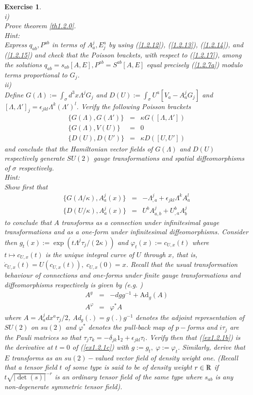 \documentclass[12pt]{report}
\newtheorem{Exercise}{Exercise}[section]
\def\ba{\begin{eqnarray}}
\def\ea{\end{eqnarray}}
\def\Rl{{\mathchoice
{\setbox0=\hbox{$\displaystyle\rm R$}\hbox{\hbox to0pt
{\kern0.4\wd0\vrule height0.9\ht0\hss}\box0}}
{\setbox0=\hbox{$\textstyle\rm R$}\hbox{\hbox to0pt
{\kern0.4\wd0\vrule height0.9\ht0\hss}\box0}}
{\setbox0=\hbox{$\scriptstyle\rm R$}\hbox{\hbox to0pt
{\kern0.4\wd0\vrule height0.9\ht0\hss}\box0}}
{\setbox0=\hbox{$\scriptscriptstyle\rm R$}\hbox{\hbox to0pt
{\kern0.4\wd0\vrule height0.9\ht0\hss}\box0}}}}
\begin{document}
\begin{Exercise} \label{ex1.2.1} ~~~~\\
i)\\
Prove theorem \ref{th1.2.0}.\\
Hint:\\
Express $q_{ab},P^{ab}$ in terms of $A_a^j,E^a_j$ by using 
(\ref{1.2.12}), (\ref{1.2.13}), (\ref{1.2.14}), and (\ref{1.2.15})
and check that the Poisson brackets, with respect to (\ref{1.2.17}),
among the solutions 
$q_{ab}=s_{ab}[A,E],P^{ab}=S^{ab}[A,E]$ equal precisely
(\ref{1.2.7a}) modulo terms proportional to $G_j$.\\
ii)\\ 
Define $G(\Lambda):=\int_\sigma d^3x \Lambda^j G_j$ and 
$D(U):=\int_\sigma U^a[V_a-A_a^j G_j]$ and $[\Lambda,\Lambda']_j
=\epsilon_{jkl} \Lambda^k(\Lambda')^l$. Verify the following 
Poisson brackets
\ba \label{ex1.2.1a}
\{G(\Lambda),G(\Lambda')\} &=& \kappa G([\Lambda,\Lambda'])
\nonumber\\
\{G(\Lambda),V(U)\} &=& 0 \nonumber\\
\{D(U),D(U')\}&=&\kappa D([U,U'])
\ea
and conclude that the Hamiltonian vector fields of $G(\Lambda)$ and $D(U)$ 
respectively generate $SU(2)$ gauge transformations and spatial
diffeomorphisms of $\sigma$ respectively. \\
Hint:\\
Show first that 
\ba \label{ex1.2.1b}
\{G(\Lambda/\kappa),A_a^j(x)\} &=&-\Lambda^j_{,a}+\epsilon_{jkl} 
\Lambda^k A_a^l \nonumber\\
\{D(U/\kappa),A_a^j(x)\} &=& U^b A^j_{a,b}+ U^b_{,a} A^j_b
\ea
to conclude that $A$ transforms as a connection under infinitesimal
gauge transformations and as a one-form under infinitesimal 
diffeomorphisms. Consider then $g_t(x):=\exp(t\Lambda^j \tau_j/(2\kappa))$
and $\varphi_t(x):=c_{U,x}(t)$ where $t\mapsto c_{U,x}(t)$ is the unique 
integral curve of $U$ through $x$, that is, 
$\dot{c}_{U,x}(t)=U(c_{U,x}(t)),\;c_{U,x}(0)=x$. Recall
that the usual transformation behaviour of connections and one-forms under
finite gauge transformations and diffeomorphisms respectively is given by
(e.g. \cite{24a})
\ba \label{ex1.2.1c}
A^g &=& -dg g^{-1}+\mbox{Ad}_g (A) \nonumber\\
A^\varphi &=& \varphi^\ast A 
\ea
where $A=A_a^j dx^a \tau_j/2$, Ad$_g(.)=g(.)g^{-1}$ denotes the 
adjoint representation of $SU(2)$ on $su(2)$ and $\varphi^\ast$ denotes 
the pull-back map of $p-$forms and $i\tau_j$ are the Pauli matrices so 
that  $\tau_j \tau_k=-\delta_{jk} 1_2+\epsilon_{jkl} \tau_l$. Verify then 
that (\ref{ex1.2.1b}) is the derivative at $t=0$ of (\ref{ex1.2.1c})
with $g:=g_t,\;\varphi:=\varphi_t$. Similarly, derive that $E$ transforms
as an $su(2)-$valued vector field of density weight one. (Recall that a 
tensor field $t$ of some type is 
said to be of density weight $r\in \Rl$ if $t\sqrt{|\det(s)|}^{-r}$ is an 
ordinary tensor field of the same type where $s_{ab}$ is any 
non-degenerate symmetric tensor field). 
\end{Exercise}
\end{document}
